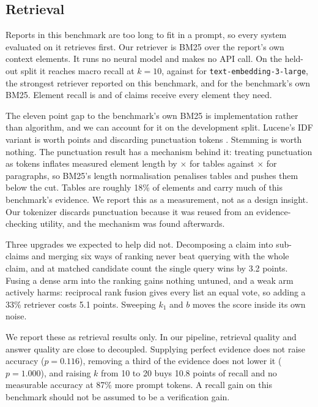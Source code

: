 %

\subsection{Retrieval}
\label{sec:retrieval}

Reports in this benchmark are too long to fit in a prompt, so every system evaluated on
it retrieves first. Our retriever is BM25 over the report's own context elements. It runs
no neural model and makes no API call. On the held-out split it reaches \recallOursTest{}
macro recall at $k{=}10$, against \recallEmbedTest{} for \texttt{text-embedding-3-large},
the strongest retriever reported on this benchmark, and \recallUpstreamBMTest{} for the
benchmark's own BM25. Element recall is \recallElementTest{} and \recallAllGoldTest{} of
claims receive every element they need.

The eleven point gap to the benchmark's own BM25 is implementation rather than
algorithm, and we can account for it on the development split. Lucene's IDF variant is
worth \ablationIDF{} points and discarding punctuation tokens \ablationPunct{}. Stemming
is worth nothing. The punctuation result has a mechanism behind it: treating punctuation
as tokens inflates measured element length by \tableInflation{}$\times$ for tables against
\paraInflation{}$\times$ for paragraphs, so BM25's length normalisation penalises tables
and pushes them below the cut. Tables are roughly 18\% of elements and carry much of this
benchmark's evidence. We report this as a measurement, not as a design insight. Our
tokenizer discards punctuation because it was reused from an evidence-checking utility,
and the mechanism was found afterwards.

Three upgrades we expected to help did not. Decomposing a claim into sub-claims and merging
six ways of ranking never beat querying with the whole claim, and at matched candidate
count the single query wins by 3.2 points. Fusing a dense arm into the ranking gains
nothing untuned, and a weak arm actively harms: reciprocal rank fusion gives every list an
equal vote, so adding a 33\% retriever costs 5.1 points. Sweeping $k_1$ and $b$ moves the
score inside its own noise.

We report these as retrieval results only. In our pipeline, retrieval quality and answer
quality are close to decoupled. Supplying perfect evidence does not raise accuracy
($p = 0.116$), removing a third of the evidence does not lower it ($p = 1.000$), and
raising $k$ from 10 to 20 buys 10.8 points of recall and no measurable accuracy at 87\%
more prompt tokens. A recall gain on this benchmark should not be assumed to be a
verification gain.

